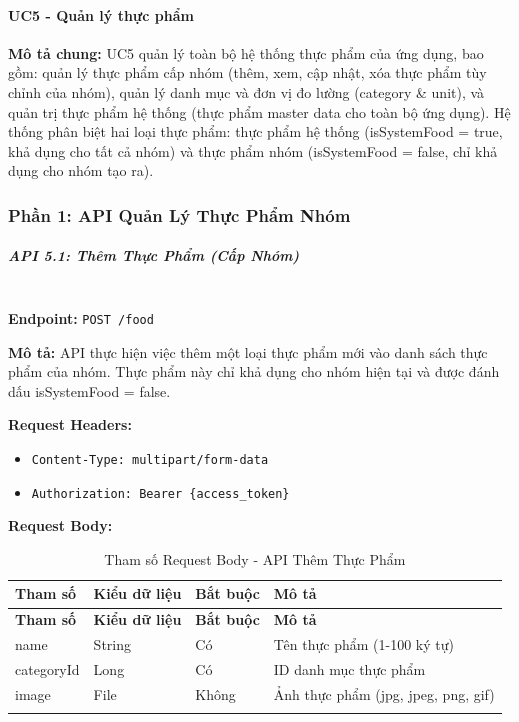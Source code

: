 \paragraph{UC5 - Quản lý thực phẩm}

\textbf{Mô tả chung:} UC5 quản lý toàn bộ hệ thống thực phẩm của ứng dụng, bao gồm: quản lý thực phẩm cấp nhóm (thêm, xem, cập nhật, xóa thực phẩm tùy chỉnh của nhóm), quản lý danh mục và đơn vị đo lường (category \& unit), và quản trị thực phẩm hệ thống (thực phẩm master data cho toàn bộ ứng dụng). Hệ thống phân biệt hai loại thực phẩm: thực phẩm hệ thống (isSystemFood = true, khả dụng cho tất cả nhóm) và thực phẩm nhóm (isSystemFood = false, chỉ khả dụng cho nhóm tạo ra).

\subsubsection{Phần 1: API Quản Lý Thực Phẩm Nhóm}

\subparagraph{API 5.1: Thêm Thực Phẩm (Cấp Nhóm)}~\\

\textbf{Endpoint:} \texttt{POST /food}

\textbf{Mô tả:} API thực hiện việc thêm một loại thực phẩm mới vào danh sách thực phẩm của nhóm. Thực phẩm này chỉ khả dụng cho nhóm hiện tại và được đánh dấu isSystemFood = false.

\textbf{Request Headers:}
\begin{itemize}
    \item \texttt{Content-Type: multipart/form-data}
    \item \texttt{Authorization: Bearer \{access\_token\}}
\end{itemize}

\textbf{Request Body:}

\small
\begin{longtable}{|>{\raggedright\arraybackslash}p{3.5cm}|>{\raggedright\arraybackslash}p{2.5cm}|>{\raggedright\arraybackslash}p{2cm}|>{\raggedright\arraybackslash}p{5.5cm}|}
\hline
\textbf{Tham số} & \textbf{Kiểu dữ liệu} & \textbf{Bắt buộc} & \textbf{Mô tả} \\
\hline
\endfirsthead
\hline
\textbf{Tham số} & \textbf{Kiểu dữ liệu} & \textbf{Bắt buộc} & \textbf{Mô tả} \\
\hline
\endhead
name & String & Có & Tên thực phẩm (1-100 ký tự) \\
\hline
categoryId & Long & Có & ID danh mục thực phẩm \\
\hline
image & File & Không & Ảnh thực phẩm (jpg, jpeg, png, gif) \\
\hline
\caption{Tham số Request Body - API Thêm Thực Phẩm}
\end{longtable}

